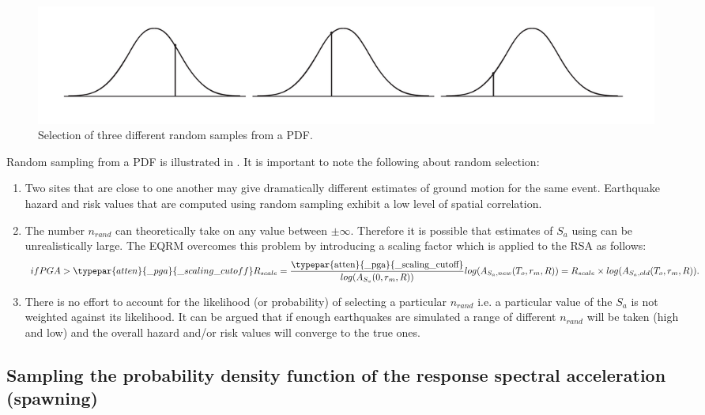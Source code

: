 \begin{figure}
\includegraphics[width=1\textwidth]{diags/fig-hattn-random}
\caption{Selection of three different random samples from a PDF.}
\label{fig:hattn-randomsamp}
\end{figure}
Random sampling from a PDF is illustrated in
. It is important to note the following
about random selection:
\begin{enumerate}
\item Two sites that are close to one another may give
dramatically different estimates of ground motion for the same
event. Earthquake hazard and risk values that are computed using
random sampling exhibit a low level of spatial correlation.
\item
The number $n_{rand}$ can theoretically take on any value between
$\pm \infty$. Therefore it is possible that estimates of $S_a$ using
 can be unrealistically large. The EQRM
overcomes this problem by introducing a scaling factor
 which is applied to the RSA
as follows:
\begin{equation}
if PGA > \typepar{atten}{\_pga}{\_scaling\_cutoff}\\
R_{scale} =
\frac{\textrm{\typepar{atten}{\_pga}{\_scaling\_cutoff}}}{log(A_{S_a}(0,r_m,R))}
\\
 log(A_{S_a,new}(T_o,r_m,R)) = R_{scale} \times
log(A_{S_a,old}(T_o,r_m,R)).
\end{equation}
\item There is no effort to account for the likelihood (or
probability) of selecting a particular $n_{rand}$ i.e. a particular
value of the $S_a$ is not weighted against its likelihood. It can be
argued that if enough earthquakes are simulated a range of different
$n_{rand}$ will be taken (high and low) and the overall hazard
and/or risk values will converge to the true ones.
\end{enumerate}


\subsection{Sampling the probability density function of
the response spectral acceleration (spawning)}
\label{attn:uncert-pdfchoice}


